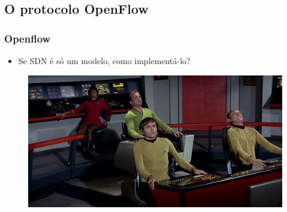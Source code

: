 
\subsection{O protocolo OpenFlow}

%
%
\begin{frame}\frametitle{Openflow}

    \begin{itemize}
    \item Se SDN é só um modelo, como implementá-lo?
    \end{itemize}
    	\begin{figure}[h]
        \centering
        \includegraphics[scale=0.5]{images/control-room.png}
    \end{figure}
\end{frame}



